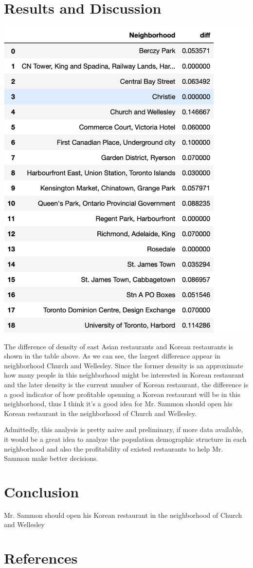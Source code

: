 \documentclass[12pt]{article}
\begin{document}
\section{Results and Discussion}
\includegraphics[scale=0.55]{image/4.png}

The difference of density of east Asian restaurants and Korean restaurants is shown in the table above. As we can see, the largest difference appear in neighborhood Church and Wellesley. Since the former density is an approximate how many people in this neighborhood might be interested in Korean restaurant and the later density is the current number of Korean restaurant, the difference is a good indicator of how profitable openning a Korean restaurant will be in this neighborhood, thus I think it's a good idea for Mr. Sammon should open his Korean restaurant in the neighborhood of Church and Wellesley. 

Admittedly, this analysis is pretty naive and preliminary, if more data available, it would be a great idea to analyze the population demographic structure in each neighborhood and also the profitability of existed restaurants to help Mr. Sammon make better decisions.

\section{Conclusion}
Mr. Sammon should open his Korean restaurant in the neighborhood of Church and Wellesley
\section {References}


%
\end{document}
